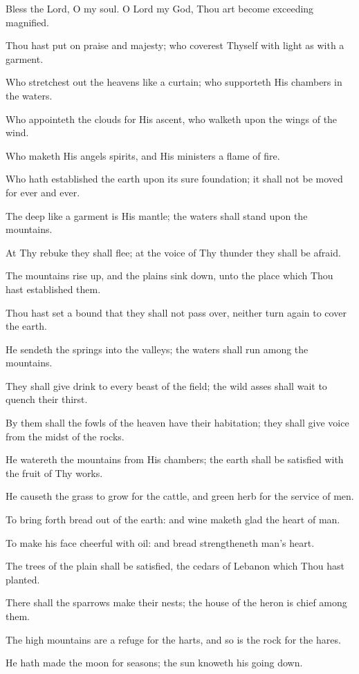 Bless the Lord, O my soul. O Lord my God, Thou art become exceeding magnified.

Thou hast put on praise and majesty; who coverest Thyself with light as with a garment.

Who stretchest out the heavens like a curtain; who supporteth His chambers in the waters.

Who appointeth the clouds for His ascent, who walketh upon the wings of the wind.

Who maketh His angels spirits, and His ministers a flame of fire.

Who hath established the earth upon its sure foundation; it shall not be moved for ever and ever.

The deep like a garment is His mantle; the waters shall stand upon the mountains.

At Thy rebuke they shall flee; at the voice of Thy thunder they shall be afraid.

The mountains rise up, and the plains sink down, unto the place which Thou hast established them.

Thou hast set a bound that they shall not pass over, neither turn again to cover the earth.

He sendeth the springs into the valleys; the waters shall run among the mountains.

They shall give drink to every beast of the field; the wild asses shall wait to quench their thirst.

By them shall the fowls of the heaven have their habitation; they shall give voice from the midst of the rocks.

He watereth the mountains from His chambers; the earth shall be satisfied with the fruit of Thy works.

He causeth the grass to grow for the cattle, and green herb for the service of men.

To bring forth bread out of the earth: and wine maketh glad the heart of man.

To make his face cheerful with oil: and bread strengtheneth man's heart.

The trees of the plain shall be satisfied, the cedars of Lebanon which Thou hast planted.

There shall the sparrows make their nests; the house of the heron is chief among them.

The high mountains are a refuge for the harts, and so is the rock for the hares.

He hath made the moon for seasons; the sun knoweth his going down.

